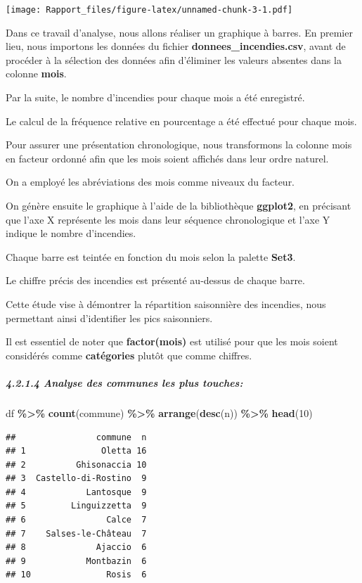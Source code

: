 \documentclass[
]{article}
\newenvironment{Shaded}{\begin{snugshade}}{\end{snugshade}}
\newcommand{\DecValTok}[1]{\textcolor[rgb]{0.00,0.00,0.81}{#1}}
\newcommand{\FunctionTok}[1]{\textcolor[rgb]{0.13,0.29,0.53}{\textbf{#1}}}
\newcommand{\NormalTok}[1]{#1}
\newcommand{\SpecialCharTok}[1]{\textcolor[rgb]{0.81,0.36,0.00}{\textbf{#1}}}
\begin{document}
\texttt{[image: Rapport\_files/figure-latex/unnamed-chunk-3-1.pdf]}

Dans ce travail d'analyse, nous allons réaliser un graphique à barres.
En premier lieu, nous importons les données du fichier
\textbf{donnees\_incendies.csv}, avant de procéder à la sélection des
données afin d'éliminer les valeurs absentes dans la colonne
\textbf{mois}.

Par la suite, le nombre d'incendies pour chaque mois a été enregistré.

Le calcul de la fréquence relative en pourcentage a été effectué pour
chaque mois.

Pour assurer une présentation chronologique, nous transformons la
colonne mois en facteur ordonné afin que les mois soient affichés dans
leur ordre naturel.

On a employé les abréviations des mois comme niveaux du facteur.

On génère ensuite le graphique à l'aide de la bibliothèque
\textbf{ggplot2}, en précisant que l'axe X représente les mois dans leur
séquence chronologique et l'axe Y indique le nombre d'incendies.

Chaque barre est teintée en fonction du mois selon la palette
\textbf{Set3}.

Le chiffre précis des incendies est présenté au-dessus de chaque barre.

Cette étude vise à démontrer la répartition saisonnière des incendies,
nous permettant ainsi d'identifier les pics saisonniers.

Il est essentiel de noter que \textbf{factor(mois)} est utilisé pour que
les mois soient considérés comme \textbf{catégories} plutôt que comme
chiffres.

\subparagraph{4.2.1.4 Analyse des communes les plus
touches:}\label{analyse-des-communes-les-plus-touches}

\begin{Shaded}
\begin{Highlighting}[]
\NormalTok{df }\SpecialCharTok{\%\textgreater{}\%} \FunctionTok{count}\NormalTok{(commune) }\SpecialCharTok{\%\textgreater{}\%} \FunctionTok{arrange}\NormalTok{(}\FunctionTok{desc}\NormalTok{(n)) }\SpecialCharTok{\%\textgreater{}\%} \FunctionTok{head}\NormalTok{(}\DecValTok{10}\NormalTok{)}
\end{Highlighting}
\end{Shaded}

\begin{verbatim}
##                commune  n
## 1               Oletta 16
## 2          Ghisonaccia 10
## 3  Castello-di-Rostino  9
## 4            Lantosque  9
## 5         Linguizzetta  9
## 6                Calce  7
## 7    Salses-le-Château  7
## 8              Ajaccio  6
## 9            Montbazin  6
## 10               Rosis  6
\end{verbatim}
\end{document}
